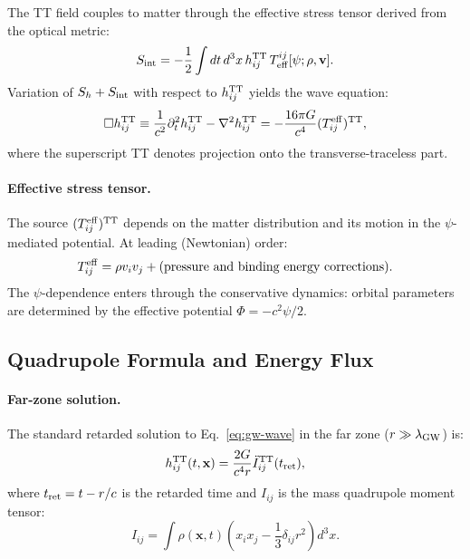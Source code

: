 The TT field couples to matter through the effective stress tensor derived from the optical metric:
\begin{equation}\label{eq:gw-coupling}
S_{\rm int} = -\frac{1}{2}\int dt\, d^3x\, h_{ij}^{\rm TT}\, T^{ij}_{\rm eff}[\psi; \rho, \mathbf{v}].
\end{equation}
Variation of $S_h + S_{\rm int}$ with respect to $h_{ij}^{\rm TT}$ yields the wave equation:
\begin{equation}\label{eq:gw-wave}
\Box h_{ij}^{\rm TT} \equiv \frac{1}{c^2}\partial_t^2 h_{ij}^{\rm TT} - \nabla^2 h_{ij}^{\rm TT} = -\frac{16\pi G}{c^4}(T_{ij}^{\rm eff})^{\rm TT},
\end{equation}
where the superscript TT denotes projection onto the transverse-traceless part.

\paragraph{Effective stress tensor.}
The source $(T_{ij}^{\rm eff})^{\rm TT}$ depends on the matter distribution and its motion in the $\psi$-mediated potential. At leading (Newtonian) order:
\begin{equation}
T_{ij}^{\rm eff} = \rho v_i v_j + \text{(pressure and binding energy corrections)}.
\end{equation}
The $\psi$-dependence enters through the conservative dynamics: orbital parameters are determined by the effective potential $\Phi = -c^2\psi/2$.

\subsection{Quadrupole Formula and Energy Flux}\label{sec:gw-quadrupole}

\paragraph{Far-zone solution.}
The standard retarded solution to Eq.~\eqref{eq:gw-wave} in the far zone ($r \gg \lambda_{\rm GW}$) is:
\begin{equation}\label{eq:gw-solution}
h_{ij}^{\rm TT}(t, \mathbf{x}) = \frac{2G}{c^4 r}\ddot{I}_{ij}^{\rm TT}(t_{\rm ret}),
\end{equation}
where $t_{\rm ret} = t - r/c$ is the retarded time and $I_{ij}$ is the mass quadrupole moment tensor:
\begin{equation}\label{eq:quadrupole-moment}
I_{ij} = \int \rho(\mathbf{x}, t)\left(x_i x_j - \frac{1}{3}\delta_{ij}r^2\right)d^3x.
\end{equation}

